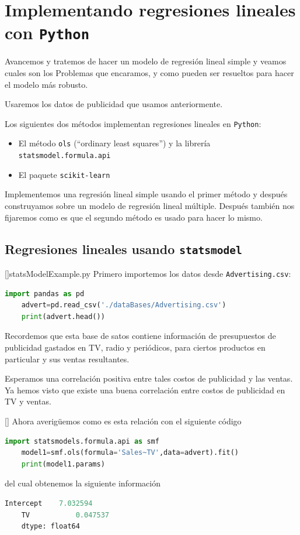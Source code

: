 \section{Implementando regresiones lineales con \texttt{Python}}

Avancemos y tratemos de hacer un modelo de regresión lineal simple y veamos cuales son los Problemas que encaramos, y como pueden ser resueltos para hacer el modelo más robusto.



Usaremos los datos de publicidad que usamos anteriormente.


Los siguientes dos métodos implementan regresiones lineales en \texttt{Python}:
\begin{itemize}
	\item El método \texttt{ols} (``ordinary least squares'') y la librería \texttt{statsmodel.formula.api}
	\item El paquete \texttt{scikit-learn}
\end{itemize}
Implementemos una regresión lineal simple usando el primer método y después construyamos sobre un modelo de regresión lineal múltiple. Después también nos fijaremos como es que el segundo método es usado para hacer lo mismo.

\subsection{Regresiones lineales usando \texttt{statsmodel}}
[]{statsModelExample.py}
Primero importemos los datos desde \texttt{Advertising.csv}:
\begin{lstlisting}[language=Python]
	import pandas as pd
	advert=pd.read_csv('./dataBases/Advertising.csv')
	print(advert.head())
\end{lstlisting}



Recordemos que esta base de satos contiene información de presupuestos de publicidad gastados en TV, radio y periódicos, para ciertos productos en particular y sus ventas resultantes.


Esperamos una correlación positiva entre tales costos de publicidad y las ventas. Ya hemos visto que existe una buena correlación entre costos de publicidad en TV y ventas.

[]{}
Ahora averigüemos como es esta relación con el siguiente código
\begin{lstlisting}[language=Python]
	import statsmodels.formula.api as smf
	model1=smf.ols(formula='Sales~TV',data=advert).fit()
	print(model1.params)
\end{lstlisting}
del cual obtenemos la siguiente información
\begin{lstlisting}[language=Python]
	Intercept    7.032594
	TV           0.047537
	dtype: float64
\end{lstlisting}



